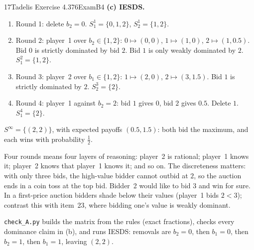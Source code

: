 \begin{exsol}{17}{Tadelis Exercise 4.3}{76}{Exam}{B4}
\textbf{(c) IESDS.}
\begin{enumerate}
  \item Round 1: delete $b_2 = 0$. $S_1^1 = \{0,1,2\}$, $S_2^1 = \{1, 2\}$.
  \item Round 2: player~1 over $b_2 \in \{1, 2\}$: $0 \mapsto (0, 0)$, $1 \mapsto (1, 0)$,
  $2 \mapsto (1, 0.5)$. Bid $0$ is strictly dominated by bid $2$. Bid $1$ is only weakly dominated
  by $2$. $S_1^2 = \{1, 2\}$.
  \item Round 3: player~2 over $b_1 \in \{1, 2\}$: $1 \mapsto (2, 0)$, $2 \mapsto (3, 1.5)$.
  Bid $1$ is strictly dominated by $2$. $S_2^3 = \{2\}$.
  \item Round 4: player~1 against $b_2 = 2$: bid $1$ gives $0$, bid $2$ gives $0.5$. Delete $1$.
  $S_1^4 = \{2\}$.
\end{enumerate}
$S^\infty = \{(2, 2)\}$, with expected payoffs $(0.5, 1.5)$: both bid the maximum, and each wins
with probability $\tfrac12$.

\interp Four rounds means four layers of reasoning: player~2 is rational; player~1 knows it;
player~2 knows that player~1 knows it; and so on. The discreteness matters: with only three
bids, the high-value bidder cannot outbid at $2$, so the auction ends in a coin toss at the top
bid. Bidder~2 would like to bid $3$ and win for sure. In a first-price auction bidders shade
below their values (player~1 bids $2 < 3$); contrast this with item~23, where bidding one's
value is weakly dominant.

\verify \texttt{check\_A.py} builds the matrix from the rules (exact fractions), checks every
dominance claim in (b), and runs IESDS: removals are $b_2 = 0$, then $b_1 = 0$, then $b_2 = 1$,
then $b_1 = 1$, leaving $(2, 2)$.

\end{exsol}
